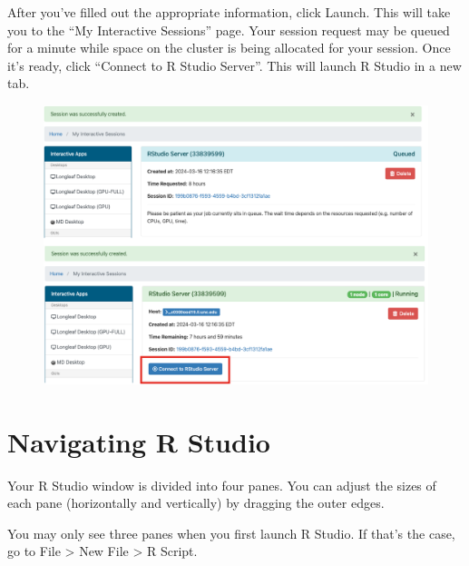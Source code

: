 \documentclass[
  letterpaper,
  DIV=11,
  numbers=noendperiod]{scrreprt}
\begin{document}
After you've filled out the appropriate information, click Launch. This
will take you to the ``My Interactive Sessions'' page. Your session
request may be queued for a minute while space on the cluster is being
allocated for your session. Once it's ready, click ``Connect to R Studio
Server''. This will launch R Studio in a new tab.

\begin{figure}

{\centering \includegraphics{scripts/00_intro/class0_images/Picture3.png}

}

\end{figure}

\hypertarget{navigating-r-studio}{%
\section{Navigating R Studio}\label{navigating-r-studio}}

Your R Studio window is divided into four panes. You can adjust the
sizes of each pane (horizontally and vertically) by dragging the outer
edges.

\begin{tcolorbox}[enhanced jigsaw, left=2mm, colframe=quarto-callout-note-color-frame, leftrule=.75mm, opacitybacktitle=0.6, toptitle=1mm, title=\textcolor{quarto-callout-note-color}{\faInfo}\hspace{0.5em}{Note}, opacityback=0, coltitle=black, colbacktitle=quarto-callout-note-color!10!white, breakable, colback=white, titlerule=0mm, bottomrule=.15mm, arc=.35mm, bottomtitle=1mm, rightrule=.15mm, toprule=.15mm]

You may only see three panes when you first launch R Studio. If that's
the case, go to File \textgreater{} New File \textgreater{} R Script.

\end{tcolorbox}
\end{document}
